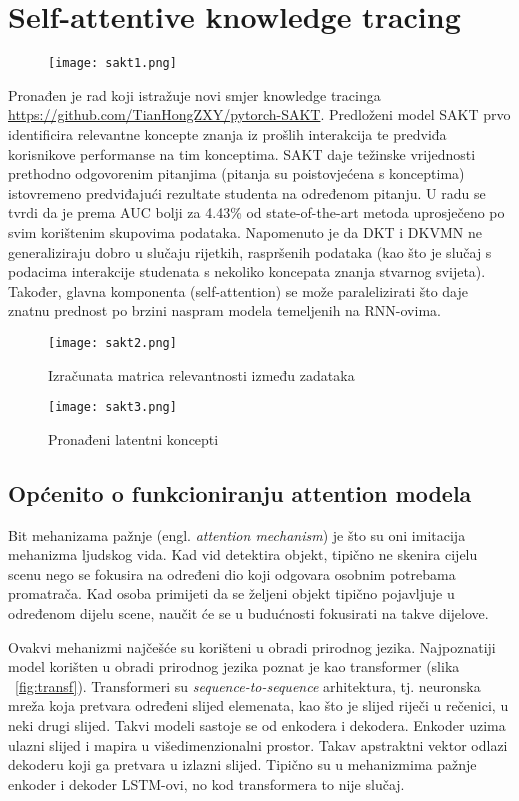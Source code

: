 
\chapter{Self-attentive knowledge tracing}
	\begin{figure}[!htb]
		\centering
		\texttt{[image: sakt1.png]}
		\caption{}
		\label{}
	\end{figure}
	Pronađen je rad \citep{sakt} koji istražuje novi smjer knowledge tracinga \url{https://github.com/TianHongZXY/pytorch-SAKT}. Predloženi model SAKT prvo identificira relevantne koncepte znanja iz prošlih interakcija te predviđa korisnikove performanse na tim konceptima. SAKT daje težinske vrijednosti prethodno odgovorenim pitanjima (pitanja su poistovjećena s konceptima) istovremeno predviđajući rezultate studenta na određenom pitanju. U radu se tvrdi da je prema AUC bolji za 4.43\% od state-of-the-art metoda uprosječeno po svim korištenim skupovima podataka. Napomenuto je da DKT i DKVMN ne generaliziraju dobro u slučaju rijetkih, raspršenih podataka (kao što je slučaj s podacima interakcije studenata s nekoliko koncepata znanja stvarnog svijeta). Također, glavna komponenta (self-attention) se može paralelizirati što daje znatnu prednost po brzini naspram modela temeljenih na RNN-ovima.

		\begin{figure}[H]
		\centering
		\texttt{[image: sakt2.png]}
		\caption{Izračunata matrica relevantnosti između zadataka}
		\label{}
	\end{figure}
	\begin{figure}[!htb]
	\centering
	\texttt{[image: sakt3.png]}
	\caption{Pronađeni latentni koncepti}
	\label{}
\end{figure}

	\section{Općenito o funkcioniranju attention modela}

	Bit mehanizama pažnje (engl. \textit{attention mechanism}) je što su oni imitacija mehanizma ljudskog vida. Kad vid detektira objekt, tipično ne skenira cijelu scenu nego se fokusira na određeni dio koji odgovara osobnim potrebama promatrača. Kad osoba primijeti da se željeni objekt tipično pojavljuje u određenom dijelu scene, naučit će se u budućnosti fokusirati na takve dijelove.

	Ovakvi mehanizmi najčešće su korišteni u obradi prirodnog jezika. Najpoznatiji model korišten u obradi prirodnog jezika poznat je kao transformer (slika ~\ref{fig:transf}). Transformeri su \textit{sequence-to-sequence} arhitektura, tj. neuronska mreža koja pretvara određeni slijed elemenata, kao što je slijed riječi u rečenici, u neki drugi slijed. Takvi modeli sastoje se od enkodera i dekodera. Enkoder uzima ulazni slijed i mapira u višedimenzionalni prostor. Takav apstraktni vektor odlazi dekoderu koji ga pretvara u izlazni slijed. Tipično su u mehanizmima pažnje enkoder i dekoder LSTM-ovi, no kod transformera to nije slučaj.

